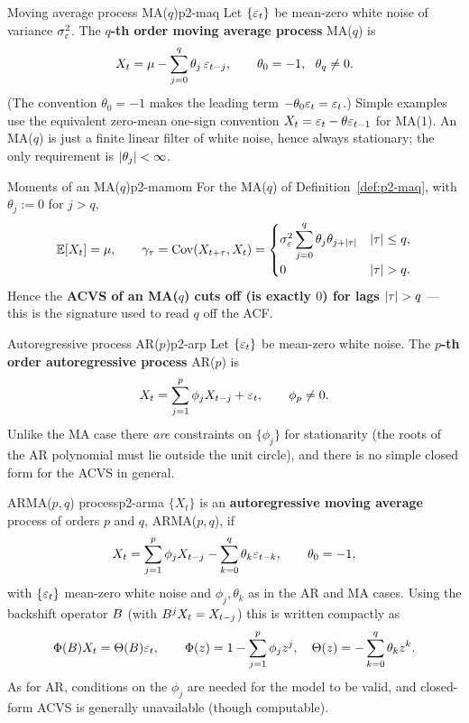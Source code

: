 \begin{definition}{Moving average process MA($q$)}{p2-maq}
Let $\{\varepsilon_t\}$ be mean-zero white noise of variance $\sigma_\varepsilon^2$. The
\textbf{$q$-th order moving average process} MA($q$) is
\[
X_t=\mu-\sum_{j=0}^{q}\theta_j\,\varepsilon_{t-j},
\qquad \theta_0=-1,\ \ \theta_q\ne0 .
\]
(The convention $\theta_0=-1$ makes the leading term $-\theta_0\varepsilon_t=\varepsilon_t$.)
Simple examples use the equivalent zero-mean one-sign convention
$X_t=\varepsilon_t-\theta\varepsilon_{t-1}$ for MA(1). An MA($q$) is just a finite linear
filter of white noise, hence always stationary; the only requirement is
$\left\lvert \theta_j \right\rvert<\infty$.
\end{definition}

\begin{definition}{Moments of an MA($q$)}{p2-mamom}
For the MA($q$) of Definition~\ref{def:p2-maq}, with $\theta_j:=0$ for $j>q$,
\[
\mathbb{E}[X_t]=\mu,
\qquad
\gamma_\tau=\operatorname{Cov}(X_{t+\tau},X_t)=
\begin{cases}
\sigma^2_\varepsilon\displaystyle\sum_{j=0}^{q}\theta_j\theta_{j+\left\lvert \tau \right\rvert} & \left\lvert \tau \right\rvert\le q,\\[2mm]
0 & \left\lvert \tau \right\rvert>q .
\end{cases}
\]
Hence the \textbf{ACVS of an MA($q$) cuts off (is exactly $0$) for lags
$\left\lvert \tau \right\rvert>q$} --- this is the signature used to read $q$ off the ACF.
\end{definition}

\begin{definition}{Autoregressive process AR($p$)}{p2-arp}
Let $\{\varepsilon_t\}$ be mean-zero white noise. The \textbf{$p$-th order
autoregressive process} AR($p$) is
\[
X_t=\sum_{j=1}^{p}\phi_j X_{t-j}+\varepsilon_t,
\qquad \phi_p\ne0 .
\]
Unlike the MA case there \emph{are} constraints on $\{\phi_j\}$ for stationarity
(the roots of the AR polynomial must lie outside the unit circle), and there is
no simple closed form for the ACVS in general.
\end{definition}

\begin{definition}{ARMA($p,q$) process}{p2-arma}
$\{X_t\}$ is an \textbf{autoregressive moving average} process of orders $p$ and
$q$, ARMA($p,q$), if
\[
X_t=\sum_{j=1}^{p}\phi_j X_{t-j}-\sum_{k=0}^{q}\theta_k\varepsilon_{t-k},
\qquad \theta_0=-1,
\]
with $\{\varepsilon_t\}$ mean-zero white noise and $\phi_j,\theta_k$ as in the AR and MA
cases. Using the backshift operator $B$ (with $B^j X_t=X_{t-j}$) this is
written compactly as
\[
\Phi(B)X_t=\Theta(B)\varepsilon_t,
\qquad
\Phi(z)=1-\sum_{j=1}^{p}\phi_j z^{j},
\quad
\Theta(z)=-\sum_{k=0}^{q}\theta_k z^{k}.
\]
As for AR, conditions on the $\phi_j$ are needed for the model to be valid, and
closed-form ACVS is generally unavailable (though computable).
\end{definition}

